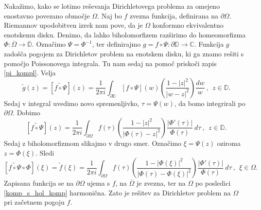 \documentclass[mat1, tisk]{fmfdelo}
\begin{document}
    Nakažimo, kako se lotimo reševanja Dirichletovega problema za omejeno enostavno povezano območje $\Omega$. Naj bo $f$ zvezna funkcija, definirana na $\partial \Omega$. 
    Riemannov upodobitven izrek nam pove, da je $\Omega$ konformno ekvivalentno enotskemu disku. 
    Denimo, da lahko biholomorfizem razširimo do homeomorfizma $\Phi: \overline{\Omega} \to \overline{\mathbb{D}}$. 
    Označimo $\Psi = \Phi^{-1}$, ter definirajmo $g = f \circ \Psi: \partial \mathbb{D} \to \mathbb{C}$. Funkcija $g$ zadošča pogojem za Dirichletov problem na enotskem disku, ki ga znamo rešiti s pomočjo Poissonovega integrala. 
    Tu nam sedaj na pomoč priskoči zapis \eqref{pi_kompl}. Velja
    $$
    \widetilde{g}(z) = [\widetilde{f \circ \Psi}](z) = \frac{1}{2\pi i}\int_{\partial \mathbb{D}}{[f \circ \Psi](w) \left(\frac{1 - |z|^2}{|w - z|^2}\right)\frac{dw}{w}}~,~~z \in \mathbb{D}. 
    $$
    Sedaj v integral uvedimo novo spremenljivko, $\tau = \Psi(w)$, da bomo integrirali po $\partial \Omega$. Dobimo
    $$
    [\widetilde{f \circ \Psi}](z) = \frac{1}{2\pi i}\int_{\partial \Omega}{f(\tau) \left(\frac{1 - |z|^2}{|\Phi(\tau) - z|^2}\right)\frac{|\Phi'(\tau)|}{\Phi(\tau)}~d \tau}~,~~z \in \mathbb{D}. 
    $$
    Sedaj z biholomorfizmom slikajmo v drugo smer. Označimo $\xi = \Psi(z)$ oziroma $z = \Phi(\xi)$. Sledi
    \begin{equation}
        \label{eno_pov_obm}
        [\widetilde{f \circ \Psi} \circ \Phi](\xi) = \widetilde{f}(\xi) = \frac{1}{2\pi i}\int_{\partial \Omega}{f(\tau) \left(\frac{1 - |\Phi(\xi)|^2}{|\Phi(\tau) - \Phi(\xi)|^2}\right)\frac{|\Phi'(\tau)|}{\Phi(\tau)}~d \tau}~,~~\xi \in \Omega. 
    \end{equation}
    Zapisana funkcija se na $\partial \Omega$ ujema s $f$, na $\overline{\Omega}$ je zvezna, ter na $\Omega$ po posledici \ref{komp_s_hol_komp} harmonična. Zato je rešitev za Dirichletov problem na $\Omega$ pri začetnem pogoju $f$.
\end{document}
